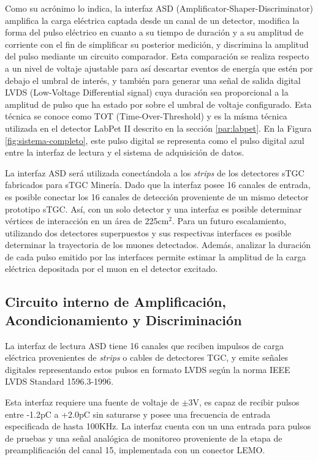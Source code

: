 Como su acrónimo lo indica, la interfaz ASD (Amplificator-Shaper-Discriminator) amplifica la carga eléctrica captada desde un canal de un detector, modifica la forma del pulso eléctrico en cuanto a su tiempo de duración y a su amplitud de corriente con el fin de simplificar su posterior medición, y discrimina la amplitud del pulso mediante un circuito comparador. Esta comparación se realiza respecto a un nivel de voltaje ajustable para así descartar eventos de energía que estén por debajo el umbral de interés, y también para generar una señal de salida digital LVDS (Low-Voltage Differential signal)\cite{1996IEEESociety} cuya duración sea proporcional a la amplitud de pulso que ha estado por sobre el umbral de voltaje configurado. Esta técnica se conoce como TOT (Time-Over-Threshold) y es la mísma técnica utilizada en el detector LabPet II descrito en la sección \ref{par:labpet}.  En la Figura \ref{fig:sistema-completo}, este pulso digital se representa como el pulso digital azul entre la interfaz de lectura y el sistema de adquisición de datos.
        
La interfaz ASD será utilizada conectándola a los \textit{strips} de los detectores sTGC fabricados para sTGC Minería. Dado que la interfaz posee 16 canales de entrada, es posible conectar los 16 canales de detección proveniente de un mismo detector prototipo sTGC. Así, con un solo detector y una interfaz es posible determinar vértices de interacción en un área de 225cm$^2$. Para un futuro escalamiento, utilizando dos detectores superpuestos y sus respectivas interfaces es posible determinar la trayectoria de los muones detectados. Además, analizar la duración de cada pulso emitido por las interfaces permite estimar la amplitud de la carga eléctrica depositada por el muon en el detector excitado.


\subsection{Circuito interno de Amplificación, Acondicionamiento y Discriminación}
La interfaz de lectura ASD tiene 16 canales que reciben impulsos de carga eléctrica provenientes de \textit{strips} o cables de detectores TGC, y emite señales digitales representando estos pulsos en formato LVDS según la norma IEEE LVDS Standard 1596.3-1996\cite{1996IEEESociety}.

Esta interfaz requiere una fuente de voltaje de $\pm$3V\cite{1999ATLASICs}, es capaz de recibir pulsos entre -1.2pC a +2.0pC sin saturarse y posee una frecuencia de entrada especificada de hasta 100KHz. La interfaz cuenta con un una entrada para pulsos de pruebas y una señal analógica de monitoreo proveniente de la etapa de preamplificación del canal 15, implementada con un conector LEMO.

